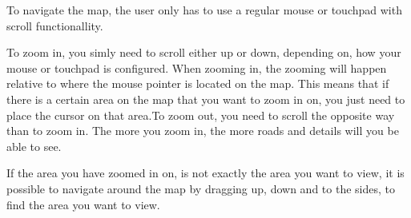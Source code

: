 To navigate the map, the user only has to use a regular mouse or touchpad with scroll functionallity.

To zoom in, you simly need to scroll either up or down, depending on, how your mouse or touchpad is configured. When zooming in, the zooming will happen relative to where the mouse pointer is located on the map. This means that if there is a certain area on the map that you want to zoom in on, you just need to place the cursor on that area.To zoom out, you need to scroll the opposite way than to zoom in. The more you zoom in, the more roads and details will you be able to see.

If the area you have zoomed in on, is not exactly the area you want to view, it is possible to navigate around the map by dragging up, down and to the sides, to find the area you want to view.
